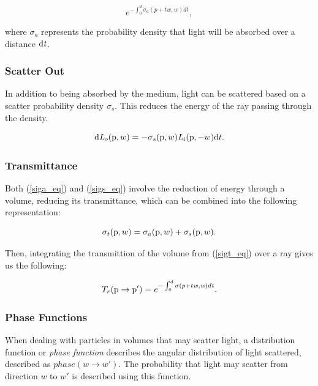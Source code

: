 \documentclass[runningheads]{llncs}
\begin{document}
\begin{equation}
e^{-\int_{0}^{d}\sigma_{a} (p+t\mathit{w},\mathit{w})d\mathit{t}},
\label{siga_eq}
\end{equation}

where $\sigma_{a}$ represents the probability density that light will be absorbed over a distance $\textup{d}\mathit{t}$.

\subsubsection{Scatter Out}
In addition to being absorbed by the medium, light can be scattered based on a scatter probability density $\sigma_{s}$.  This reduces the energy of the ray passing through the density.

\begin{equation}
\textup{d}\mathit{L}_{o}(\textup{p},w) = -\sigma_{s}(\textup{p},w) \mathit{L}_{i}(\textup{p},-w)\textup{d}t.
\label{sigs_eq}
\end{equation}

\subsubsection{Transmittance}
Both (\ref{siga_eq}) and (\ref{sigs_eq}) involve the reduction of energy through a volume, reducing its transmittance, which can be combined into the following representation:

\begin{equation}
\sigma_{t}(\textup{p},w) = \sigma_{a}(\textup{p},w) + \sigma_{s}(\textup{p}, w).
\label{sigt_eq}
\end{equation}

Then, integrating the transmittion of the volume from (\ref{sigt_eq}) over a ray gives us the following:

\begin{equation}
T_{r}(\textup{p} \to \textup{p}') = e^{-\int_{0}^{d}\sigma (p+t\mathit{w},\mathit{w})d\mathit{t}}.
\label{transmittion_eq}
\end{equation}

\subsubsection{Phase Functions}
When dealing with particles in volumes that may scatter light, a distribution function or \textit{phase function} describes the angular distribution of light scattered, described as $phase(w \to w')$.  The probability that light may scatter from direction $w$ to $w'$ is described using this function.
\end{document}

